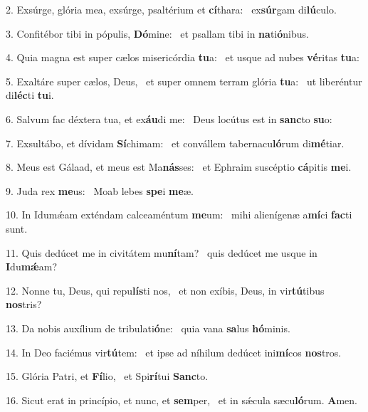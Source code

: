 2. Exsúrge, glória mea, exsúrge, psaltérium et \textbf{cí}thara: \ast\  ex\textbf{súr}gam di\textbf{lú}culo.\

3. Confitébor tibi in pópulis, \textbf{Dó}mine: \ast\  et psallam tibi in \textbf{na}ti\textbf{ó}nibus.\

4. Quia magna est super cælos misericórdia \textbf{tu}a: \ast\  et usque ad nubes \textbf{vé}ritas \textbf{tu}a:\

5. Exaltáre super cælos, Deus, \dag\  et super omnem terram glória \textbf{tu}a: \ast\  ut liberéntur di\textbf{léc}ti \textbf{tu}i.\

6. Salvum fac déxtera tua, et ex\textbf{áu}di me: \ast\  Deus locútus est in \textbf{sanc}to \textbf{su}o:\

7. Exsultábo, et dívidam \textbf{Sí}chimam: \ast\  et convállem tabernacu\textbf{ló}rum di\textbf{mé}tiar.\

8. Meus est Gálaad, et meus est Ma\textbf{nás}ses: \ast\  et Ephraim suscéptio \textbf{cá}pitis \textbf{me}i.\

9. Juda rex \textbf{me}us: \ast\  Moab lebes \textbf{spe}i \textbf{me}æ.\

10. In Idumǽam exténdam calceaméntum \textbf{me}um: \ast\  mihi alienígenæ a\textbf{mí}ci \textbf{fac}ti sunt.\

11. Quis dedúcet me in civitátem mu\textbf{ní}tam? \ast\  quis dedúcet me usque in \textbf{I}du\textbf{mǽ}am?\

12. Nonne tu, Deus, qui repu\textbf{lís}ti nos, \ast\  et non exíbis, Deus, in vir\textbf{tú}tibus \textbf{nos}tris?\

13. Da nobis auxílium de tribulati\textbf{ó}ne: \ast\  quia vana \textbf{sa}lus \textbf{hó}minis.\

14. In Deo faciémus vir\textbf{tú}tem: \ast\  et ipse ad níhilum dedúcet ini\textbf{mí}cos \textbf{nos}tros.\

15. Glória Patri, et \textbf{Fí}lio, \ast\  et Spi\textbf{rí}tui \textbf{Sanc}to.\

16. Sicut erat in princípio, et nunc, et \textbf{sem}per, \ast\  et in sǽcula sæcu\textbf{ló}rum. \textbf{A}men.\

